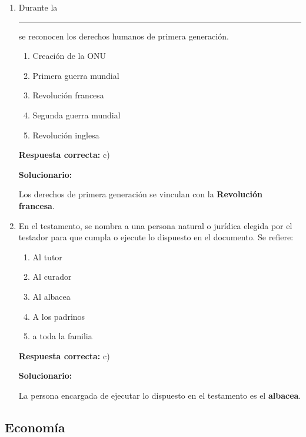 \begin{enumerate}[resume]
	
	\item Durante la \rule{2cm}{0.4pt} se reconocen los derechos humanos de primera generación.
	\begin{enumerate}[label=\alph*)]
		\item Creación de la ONU
		\item Primera guerra mundial
		\item Revolución francesa
		\item Segunda guerra mundial
		\item Revolución inglesa
	\end{enumerate}
	\textbf{Respuesta correcta:} c)
	
	\vspace{2mm}
	\textbf{Solucionario:}
	
	Los derechos de primera generación se vinculan con la \textbf{Revolución francesa}.
	
	\vspace{6mm}
	
	\item En el testamento, se nombra a una persona natural o jurídica elegida por el testador para que cumpla o ejecute lo dispuesto en el documento. Se refiere:
	\begin{enumerate}[label=\alph*)]
		\item Al tutor
		\item Al curador
		\item Al albacea
		\item A los padrinos
		\item a toda la familia
	\end{enumerate}
	\textbf{Respuesta correcta:} c)
	
	\vspace{2mm}
	\textbf{Solucionario:}
	
	La persona encargada de ejecutar lo dispuesto en el testamento es el \textbf{albacea}.
	
	\vspace{6mm}
	
\end{enumerate}

\subsection*{Economía}

